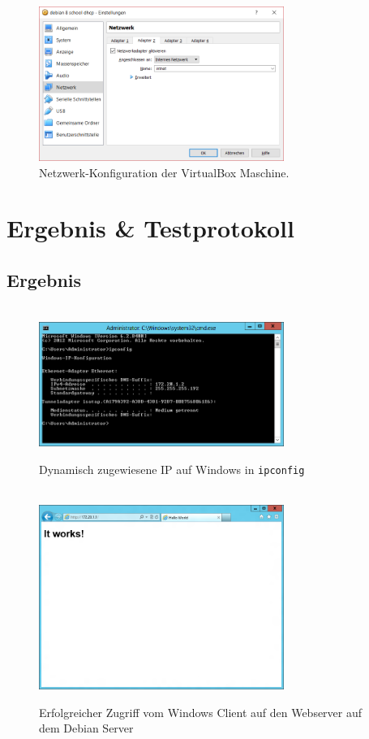 \documentclass[12pt,a4paper,twoside,titlepage]{article}
\begin{document}
		\begin{figure}
			\hrulefill\\
			\center
			
			\includegraphics[width=8cm]{vbox_network_config}
			\caption{\label{vboxconfig} Netzwerk-Konfiguration der VirtualBox Maschine.}
			\hrulefill
		\end{figure}

		\section{Ergebnis \& Testprotokoll}
		
		\subsection{Ergebnis}
		
        \begin{figure}
          \hrulefill\\
          \center
          \includegraphics[width=8cm]{cmd_ipconfig_dynamic_ip}
          \caption{\label{dynip} Dynamisch zugewiesene IP auf Windows in \texttt{ipconfig}}
          \hrulefill
        \end{figure}

        \begin{figure}
	      \hrulefill\\
	      \center
          \includegraphics[width=8cm]{ie_web_example}
          \caption{\label{webserver} Erfolgreicher Zugriff vom Windows Client auf den Webserver auf dem Debian Server}
          \hrulefill
        \end{figure}
        
\end{document}
